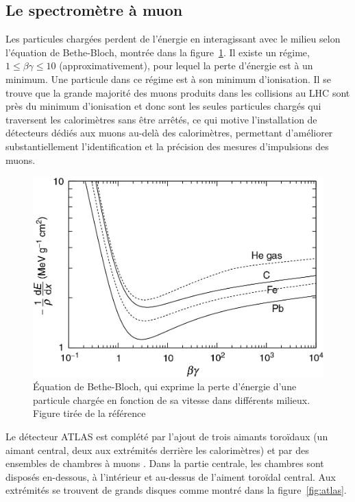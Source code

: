 \subsection{Le spectromètre à muon}
\label{sec:lhc_atlas:atlas:mu}

Les particules chargées perdent de l'énergie en interagissant avec le
milieu selon l'équation de Bethe-Bloch, montrée dans la
figure~\ref{fig:bethe-bloch}. Il existe un régime,
$1 \le\beta\gamma\le 10$ (approximativement), pour lequel la perte
d'énergie est à un minimum. Une particule dans ce régime est à son
minimum d'ionisation. Il se trouve que la grande majorité des muons
produits dans les collisions au LHC sont près du minimum d'ionisation
et donc sont les seules particules chargés qui traversent les
calorimètres sans être arrêtés, ce qui motive l'installation de
détecteurs dédiés aux muons au-delà des calorimètres, permettant
d'améliorer substantiellement l'identification et la précision des
mesures d'impulsions des muons.

\begin{figure}
  \centering
  \includegraphics{bethe_bloch.jpg}
  \caption{Équation de Bethe-Bloch, qui exprime la perte d'énergie
    d'une particule chargée en fonction de sa vitesse dans différents
    milieux. Figure tirée de la référence~\cite{thomson_modern_2013}}
  \label{fig:bethe-bloch}
\end{figure}

Le détecteur ATLAS est complété par l'ajout de trois aimants toroïdaux
(un aimant central, deux aux extrémités derrière les calorimètres) et
par des ensembles de chambres à muons . Dans la partie centrale, les
chambres sont disposés en-dessous, à l'intérieur et au-dessus de
l'aiment toroïdal central. Aux extrémités se trouvent de grands
disques comme montré dans la figure~\ref{fig:atlas}.

